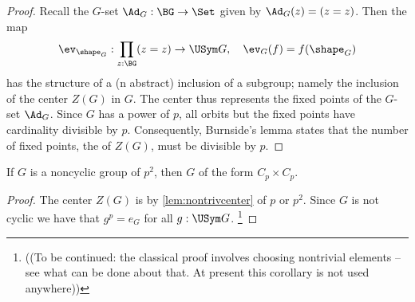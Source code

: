 \begin{proof}
  Recall the $G$-set $\Ad_G:\BG\to\Set$ given by $\Ad_G(z)=(z=z)$.
Then the map
$$\ev_{\shape_G}:\prod_{z:\BG}(z=z)\to\USym G,\quad \ev_G(f)=f(\shape_G)$$
has the structure of a (n abstract) inclusion of a subgroup; namely the inclusion of the center $Z(G)$ in $G$.
The center thus represents the fixed points of the $G$-set $\Ad_G$.
Since $G$ has \gporder a power of $p$, all orbits but the fixed points have cardinality divisible by $p$.
Consequently, Burnside's lemma states that the number of fixed points, \ie the \gporder of $Z(G)$, must be divisible by $p$.
\end{proof}
\begin{corollary}
  \label{cor:orderpsquaredgroups}
  If $G$ is a noncyclic group of \gporder $p^2$, then $G$ of the form $C_p\times C_p$.
\end{corollary}
\begin{proof}
  The center $Z(G)$ is by \cref{lem:nontrivcenter} of \gporder $p$ or $p^2$.
  Since $G$ is not cyclic we have that $g^p=e_G$ for all $g:\USym G$.
\footnote{((To be continued: the classical proof involves choosing nontrivial elements  -- see what can be done about that.  At present this corollary is not used anywhere))}
\end{proof}
